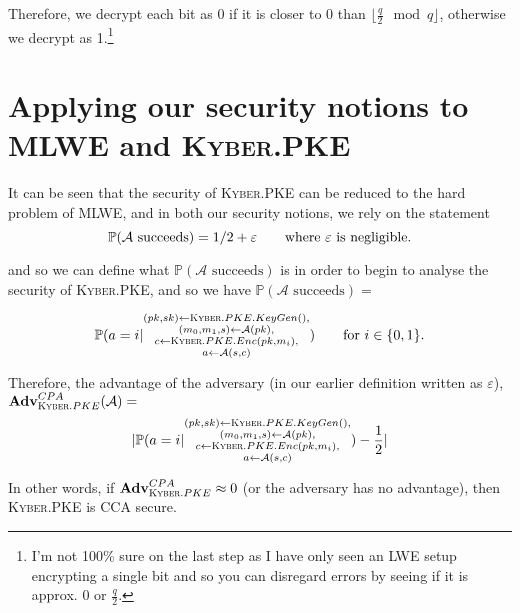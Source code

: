 \documentclass[a4paper, 10pt]{article}
\theoremstyle{definition}
\begin{document}
Therefore, we decrypt each bit as 0 if it is closer to 0 than $\lfloor \frac{q}{2} \mod{q}\rfloor $, otherwise we decrypt as 1.\footnote{I'm not 100\% sure on the last step as I have only seen an LWE setup encrypting a single bit and so you can disregard errors by seeing if it is approx. 0 or $\frac{q}{2}$.}

\section{Applying our security notions to MLWE and \textsc{Kyber}.PKE}

It can be seen that the security of \textsc{Kyber}.PKE can be reduced to the hard problem of MLWE, and in both our security notions, we rely on the statement
\[\mathbb{P} (\mathcal{A} \mbox{ succeeds}) = 1/2 + \varepsilon \mbox{\qquad where $\varepsilon$ is negligible.}\]

and so we can define what $\mathbb{P} (\mathcal{A} \mbox{ succeeds})$ is in order to begin to analyse the security of \textsc{Kyber}.PKE, and so we have $\mathbb{P} (\mathcal{A} \mbox{ succeeds})=$

\[\mathbb{P} (a =  i |\substack{ (pk, sk) \leftarrow \textsc{Kyber}.PKE.KeyGen(),\\ (m_0, m_1, s) \leftarrow \mathcal{A}(pk),\\ c \leftarrow \textsc{Kyber}.PKE.Enc(pk, m_i),\\ a \leftarrow \mathcal{A}(s, c)}) \qquad \mbox{for $i \in \{0,1\}$.}\]


Therefore, the advantage of the adversary (in our earlier definition written as $\varepsilon$),\\ $\mathbf{Adv}^{CPA}_{\textsc{Kyber}.PKE}(\mathcal{A}) =$
\[ |\mathbb{P} (a =  i |\substack{(pk, sk) \leftarrow \textsc{Kyber}.PKE.KeyGen(),\\ (m_0, m_1, s) \leftarrow \mathcal{A}(pk),\\ c \leftarrow \textsc{Kyber}.PKE.Enc(pk, m_i),\\ a \leftarrow \mathcal{A}(s, c)}) - \frac{1}{2}| \]

In other words, if $\mathbf{Adv}^{CPA}_{\textsc{Kyber}.PKE} \approx 0$ (or the adversary has no advantage), then \textsc{Kyber}.PKE is CCA secure.\par
\end{document}
